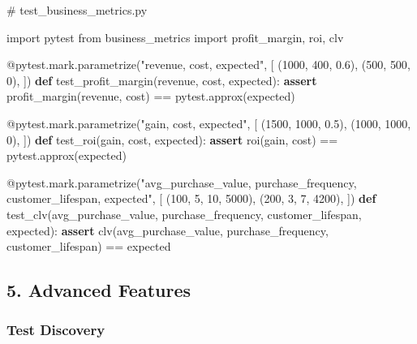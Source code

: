 \documentclass[
  letterpaper,
  DIV=11,
  numbers=noendperiod]{scrreprt}
\newenvironment{Shaded}{\begin{snugshade}}{\end{snugshade}}
\newcommand{\AttributeTok}[1]{\textcolor[rgb]{0.40,0.45,0.13}{#1}}
\newcommand{\CommentTok}[1]{\textcolor[rgb]{0.37,0.37,0.37}{#1}}
\newcommand{\ControlFlowTok}[1]{\textcolor[rgb]{0.00,0.23,0.31}{\textbf{#1}}}
\newcommand{\DecValTok}[1]{\textcolor[rgb]{0.68,0.00,0.00}{#1}}
\newcommand{\FloatTok}[1]{\textcolor[rgb]{0.68,0.00,0.00}{#1}}
\newcommand{\ImportTok}[1]{\textcolor[rgb]{0.00,0.46,0.62}{#1}}
\newcommand{\KeywordTok}[1]{\textcolor[rgb]{0.00,0.23,0.31}{\textbf{#1}}}
\newcommand{\NormalTok}[1]{\textcolor[rgb]{0.00,0.23,0.31}{#1}}
\newcommand{\OperatorTok}[1]{\textcolor[rgb]{0.37,0.37,0.37}{#1}}
\newcommand{\StringTok}[1]{\textcolor[rgb]{0.13,0.47,0.30}{#1}}
\begin{document}
\begin{Shaded}
\begin{Highlighting}[]
\CommentTok{\# test\_business\_metrics.py}

\ImportTok{import}\NormalTok{ pytest}
\ImportTok{from}\NormalTok{ business\_metrics }\ImportTok{import}\NormalTok{ profit\_margin, roi, clv}

\AttributeTok{@pytest.mark.parametrize}\NormalTok{(}\StringTok{"revenue, cost, expected"}\NormalTok{, [}
\NormalTok{    (}\DecValTok{1000}\NormalTok{, }\DecValTok{400}\NormalTok{, }\FloatTok{0.6}\NormalTok{),}
\NormalTok{    (}\DecValTok{500}\NormalTok{, }\DecValTok{500}\NormalTok{, }\DecValTok{0}\NormalTok{),}
\NormalTok{])}
\KeywordTok{def}\NormalTok{ test\_profit\_margin(revenue, cost, expected):}
    \ControlFlowTok{assert}\NormalTok{ profit\_margin(revenue, cost) }\OperatorTok{==}\NormalTok{ pytest.approx(expected)}

\AttributeTok{@pytest.mark.parametrize}\NormalTok{(}\StringTok{"gain, cost, expected"}\NormalTok{, [}
\NormalTok{    (}\DecValTok{1500}\NormalTok{, }\DecValTok{1000}\NormalTok{, }\FloatTok{0.5}\NormalTok{),}
\NormalTok{    (}\DecValTok{1000}\NormalTok{, }\DecValTok{1000}\NormalTok{, }\DecValTok{0}\NormalTok{),}
\NormalTok{])}
\KeywordTok{def}\NormalTok{ test\_roi(gain, cost, expected):}
    \ControlFlowTok{assert}\NormalTok{ roi(gain, cost) }\OperatorTok{==}\NormalTok{ pytest.approx(expected)}

\AttributeTok{@pytest.mark.parametrize}\NormalTok{(}\StringTok{"avg\_purchase\_value, purchase\_frequency, customer\_lifespan, expected"}\NormalTok{, [}
\NormalTok{    (}\DecValTok{100}\NormalTok{, }\DecValTok{5}\NormalTok{, }\DecValTok{10}\NormalTok{, }\DecValTok{5000}\NormalTok{),}
\NormalTok{    (}\DecValTok{200}\NormalTok{, }\DecValTok{3}\NormalTok{, }\DecValTok{7}\NormalTok{, }\DecValTok{4200}\NormalTok{),}
\NormalTok{])}
\KeywordTok{def}\NormalTok{ test\_clv(avg\_purchase\_value, purchase\_frequency, customer\_lifespan, expected):}
    \ControlFlowTok{assert}\NormalTok{ clv(avg\_purchase\_value, purchase\_frequency, customer\_lifespan) }\OperatorTok{==}\NormalTok{ expected}
\end{Highlighting}
\end{Shaded}

\subsection{5. Advanced Features}\label{advanced-features-1}

\subsubsection{Test Discovery}\label{test-discovery-1}
\end{document}
